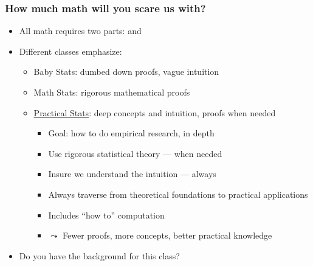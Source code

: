 \documentclass[aspectratio=169,handout]{beamer}
\begin{document}
    \begin{frame}
        \frametitle{How much math will you scare us with?}
        \begin{itemize}
            \item All math requires two parts:  and
            \item Different classes emphasize:
            \begin{itemize}
                \item \alert{Baby Stats}: dumbed down proofs, vague intuition
                \item \alert{Math Stats}: rigorous mathematical proofs
                \item \alert{\underline{Practical Stats}}: deep concepts and
                intuition, proofs when needed
                \begin{itemize}
                    \item Goal: how to do empirical research, in depth
                    \item Use rigorous statistical theory --- when needed
                    \item Insure we understand the intuition --- always
                    \item Always traverse from theoretical foundations to practical
                    applications
                    \item Includes ``how to'' computation
                    \item $\leadsto$ Fewer proofs, more concepts, better practical
                    knowledge
                \end{itemize}
            \end{itemize}
            \item Do you have the background for this class? 
        \end{itemize}
    \end{frame}
\end{document}
